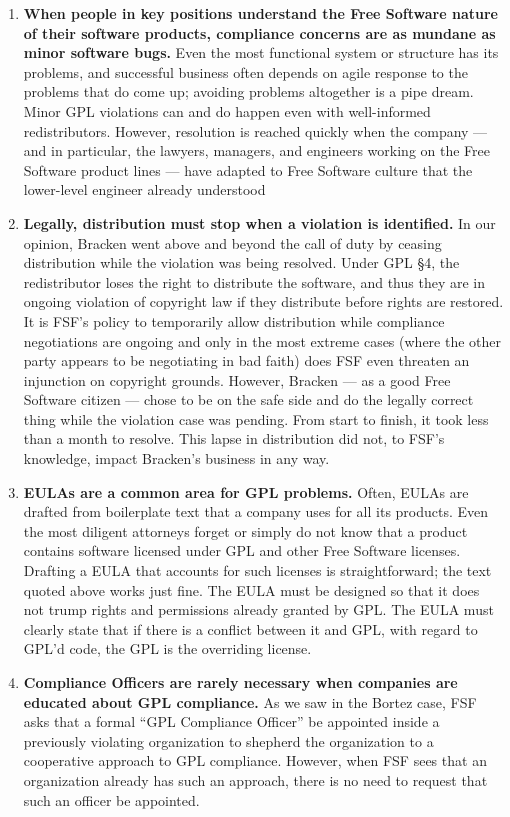 {\begin{enumerate}
\item {\bf When people in key positions understand the Free Software
  nature of their software products, compliance concerns are as
  mundane as minor software bugs.}  Even the most functional system or
  structure has its problems, and successful business often depends on
  agile response to the problems that do come up; avoiding problems
  altogether is a pipe dream. Minor GPL violations can and do happen
  even with well-informed redistributors. However, resolution is
  reached quickly when the company --- and in particular, the lawyers,
  managers, and engineers working on the Free Software product lines
  --- have adapted to Free Software culture that the lower-level
  engineer already understood

\item {\bf Legally, distribution must stop when a violation is
  identified.}  In our opinion, Bracken went above and beyond the call of
  duty by ceasing distribution while the violation was being resolved.
  Under GPL \S 4, the redistributor loses the right to distribute the
  software, and thus they are in ongoing violation of copyright law if
  they distribute before rights are restored. It is FSF's policy to
  temporarily allow distribution while compliance negotiations are ongoing
  and only in the most extreme cases (where the other party appears to be
  negotiating in bad faith) does FSF even threaten an injunction on
  copyright grounds. However, Bracken --- as a good Free Software citizen
  --- chose to be on the safe side and do the legally correct thing while
  the violation case was pending. From start to finish, it took less
  than a month to resolve. This lapse in distribution did not, to FSF's
  knowledge, impact Bracken's business in any way.

\item {\bf EULAs are a common area for GPL problems.}  Often, EULAs
  are drafted from boilerplate text that a company uses for all its
  products. Even the most diligent attorneys forget or simply do not
  know that a product contains software licensed under GPL and other
  Free Software licenses. Drafting a EULA that accounts for such
  licenses is straightforward; the text quoted above works just fine.
  The EULA must be designed so that it does not trump rights and
  permissions already granted by GPL\@. The EULA must clearly state
  that if there is a conflict between it and GPL, with regard to GPL'd
  code, the GPL is the overriding license.

\item {\bf Compliance Officers are rarely necessary when companies are
  educated about GPL compliance.}  As we saw in the Bortez case, FSF asks
  that a formal ``GPL Compliance Officer'' be appointed inside a
  previously violating organization to shepherd the organization to a
  cooperative approach to GPL compliance. However, when FSF
  sees that an organization already has such an approach, there is no
  need to request that such an officer be appointed.


\end{enumerate}}
